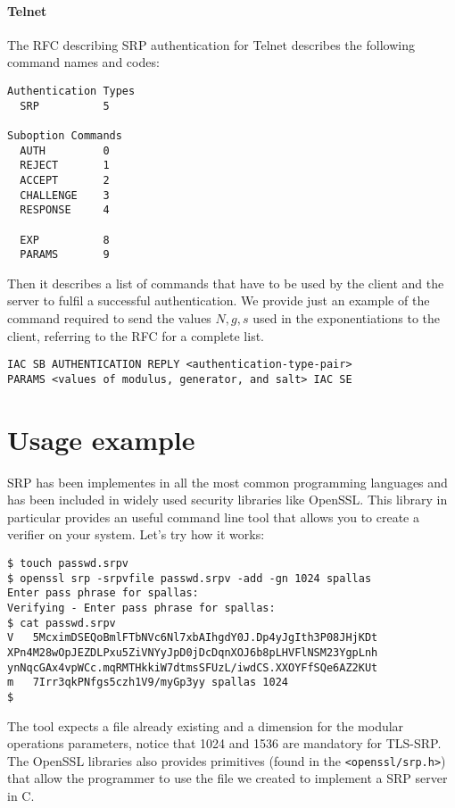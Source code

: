 \documentclass[11pt]{article}
\begin{document}
\paragraph*{Telnet}
The RFC describing SRP authentication \cite{RFC2944} for Telnet describes the following command names and codes:
\begin{verbatim}
Authentication Types
  SRP          5
	  
Suboption Commands
  AUTH         0
  REJECT       1
  ACCEPT       2
  CHALLENGE    3
  RESPONSE     4

  EXP          8
  PARAMS       9
\end{verbatim}

Then it describes a list of commands that have to be used by the client and the server to fulfil a successful authentication. We provide just an example of the command required to send the values $N, g, s$ used in the exponentiations to the client, referring to the RFC for a complete list.
\begin{verbatim}
IAC SB AUTHENTICATION REPLY <authentication-type-pair> 
PARAMS <values of modulus, generator, and salt> IAC SE
\end{verbatim}

\section{Usage example}
SRP has been implementes in all the most common programming languages and has been included in widely used security libraries like OpenSSL. This library in particular provides an useful command line tool that allows you to create a verifier on your system. Let's try how it works:
\begin{verbatim}
$ touch passwd.srpv
$ openssl srp -srpvfile passwd.srpv -add -gn 1024 spallas
Enter pass phrase for spallas:
Verifying - Enter pass phrase for spallas:
$ cat passwd.srpv
V	5McximDSEQoBmlFTbNVc6Nl7xbAIhgdY0J.Dp4yJgIth3P08JHjKDt
XPn4M28wOpJEZDLPxu5ZiVNYyJpD0jDcDqnXOJ6b8pLHVFlNSM23YgpLnh
ynNqcGAx4vpWCc.mqRMTHkkiW7dtmsSFUzL/iwdCS.XXOYFfSQe6AZ2KUt
m	7Irr3qkPNfgs5czh1V9/myGp3yy	spallas	1024
$
\end{verbatim}
The tool expects a file already existing and a dimension for the modular operations parameters, notice that 1024 and 1536 are mandatory for TLS-SRP. The OpenSSL libraries also provides primitives (found in the \texttt{<openssl/srp.h>}) that allow the programmer to use the file we created to implement a SRP server in C.
\end{document}
